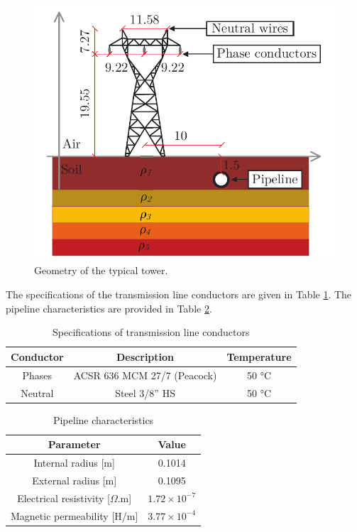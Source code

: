 \documentclass[conference]{IEEEtran}
\begin{document}
	\begin{figure}[hbt]
		\begin{center}
			\includegraphics[width=.8\columnwidth]{fig/SistTesteCorte2.pdf}
			\caption{Geometry of the typical tower.}
			\label{fig:SistTesteCorte}
		\end{center}
	\end{figure}
	
	The specifications of the transmission line conductors  are given in Table \ref{table:LTCond}. The pipeline characteristics are provided in Table \ref{table:PipeParam}.
	
	\begin{table}[!hbt]
		\renewcommand{\arraystretch}{1.3}
		\caption{Specifications of transmission line conductors}
		\label{table:LTCond}
		\centering
		\begin{tabular}{|c|c|c|}
			\hline
			\textbf{Conductor} & \textbf{Description} & \textbf{Temperature} \\
			\hline
			Phases & ACSR 636 MCM 27/7 (Peacock) & 50 °C\\
			\hline
			Neutral & Steel 3/8” HS & 50 °C\\
			\hline
		\end{tabular}
	\end{table}
	
	\begin{table}[!hbt]
		\renewcommand{\arraystretch}{1.3}
		\caption{Pipeline characteristics}
		\label{table:PipeParam}
		\centering
		\begin{tabular}{|c|c|}
			\hline
			\textbf{Parameter} & \textbf{Value} \\
			\hline
			Internal radius [m] & 0.1014\\
			\hline
			External radius [m] & 0.1095\\
			\hline
			Electrical resistivity [$\Omega$.m] & $1.72\times10^{-7}$\\
			\hline
			Magnetic permeability [H/m] & $3.77\times10^{-4}$\\
			\hline
		\end{tabular}
	\end{table}
	
\end{document}

